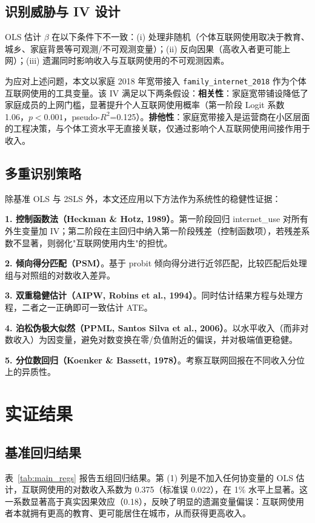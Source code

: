 \documentclass[a4paper,11pt]{article}
\begin{document}
\subsection{识别威胁与 IV 设计}

OLS 估计 $\beta$ 在以下条件下不一致：(i) 处理非随机（个体互联网使用取决于教育、城乡、家庭背景等可观测/不可观测变量）；(ii) 反向因果（高收入者更可能上网）；(iii) 遗漏同时影响收入与互联网使用的不可观测因素。

为应对上述问题，本文以家庭 2018 年宽带接入 \texttt{family\_internet\_2018} 作为个体互联网使用的工具变量。该 IV 满足以下两条假设：\textbf{相关性}：家庭宽带铺设降低了家庭成员的上网门槛，显著提升个人互联网使用概率（第一阶段 Logit 系数 1.06，$p<0.001$，pseudo-$R^2$=0.125）。\textbf{排他性}：家庭宽带接入是运营商在小区层面的工程决策，与个体工资水平无直接关联，仅通过影响个人互联网使用间接作用于收入。

\subsection{多重识别策略}

除基准 OLS 与 2SLS 外，本文还应用以下方法作为系统性的稳健性证据：

\textbf{1. 控制函数法（Heckman \& Hotz, 1989）}。第一阶段回归 internet_use 对所有外生变量加 IV；第二阶段在主回归中纳入第一阶段残差（控制函数项），若残差系数不显著，则弱化"互联网使用内生"的担忧。

\textbf{2. 倾向得分匹配（PSM）}。基于 probit 倾向得分进行近邻匹配，比较匹配后处理组与对照组的对数收入差异。

\textbf{3. 双重稳健估计（AIPW, Robins et al., 1994）}。同时估计结果方程与处理方程，二者之一正确即可一致估计 ATE。

\textbf{4. 泊松伪极大似然（PPML, Santos Silva et al., 2006）}。以水平收入（而非对数收入）为因变量，避免对数变换在零/负值附近的偏误，并对极端值更稳健。

\textbf{5. 分位数回归（Koenker \& Bassett, 1978）}。考察互联网回报在不同收入分位上的异质性。

\section{实证结果}

\subsection{基准回归结果}

表~\ref{tab:main_regs} 报告五组回归结果。第 (1) 列是不加入任何协变量的 OLS 估计，互联网使用的对数收入系数为 0.375（标准误 0.022），在 1\% 水平上显著。这一系数显著高于真实因果效应（0.18），反映了明显的遗漏变量偏误：互联网使用者本就拥有更高的教育、更可能居住在城市，从而获得更高收入。
\end{document}
